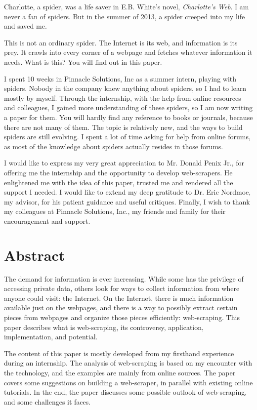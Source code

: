 \documentclass[12pt]{report}
\begin{document}
Charlotte, a spider, was a life saver in E.B. White's novel, \textit{Charlotte's Web}. I am never a fan of spiders. But in the summer of 2013, a spider creeped into my life and saved me.

This is not an ordinary spider. The Internet is its web, and information is its prey. It crawls into every corner of a webpage and fetches whatever information it needs. What is this? You will find out in this paper.

I spent 10 weeks in Pinnacle Solutions, Inc as a summer intern, playing with spiders. Nobody in the company knew anything about spiders, so I had to learn mostly by myself. Through the internship, with the help from online resources and colleagues, I gained more understanding of these spiders, so I am now writing a paper for them. You will hardly find any reference to books or journals, because there are not many of them. The topic is relatively new, and the ways to build spiders are still evolving. I spent a lot of time asking for help from online forums, as most of the knowledge about spiders actually resides in those forums.

I would like to express my very great appreciation to Mr. Donald Penix Jr., for offering me the internship and the opportunity to develop web-scrapers. He enlightened me with the idea of this paper, trusted me and rendered all the support I needed. I would like to extend my deep gratitude to Dr. Eric Nordmoe, my advisor, for his patient guidance and useful critiques. Finally, I wish to thank my colleagues at Pinnacle Solutions, Inc., my friends and family for their encouragement and support.

\chapter*{Abstract}

The demand for information is ever increasing. While some has the privilege of accessing private data, others look for ways to collect information from where anyone could visit: the Internet. On the Internet, there is much information available just on the webpages, and there is a way to possibly extract certain pieces from webpages and organize those pieces efficiently: web-scraping. This paper describes what is web-scraping, its controversy, application, implementation, and potential. 

The content of this paper is mostly developed from my firsthand experience during an internship. The analysis of web-scraping is based on my encounter with the technology, and the examples are mainly from online sources. The paper covers some suggestions on building a web-scraper, in parallel with existing online tutorials. In the end, the paper discusses some possible outlook of web-scraping, and some challenges it faces. 
\end{document}
